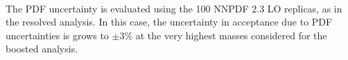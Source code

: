 \paragraph{}
The PDF uncertainty is evaluated using the 100 NNPDF 2.3 LO replicas, as in the resolved analysis. 
In this case, the uncertainty in acceptance due to PDF uncertainties is grows to $\pm3\%$ at the very highest masses considered for the boosted analysis. %
